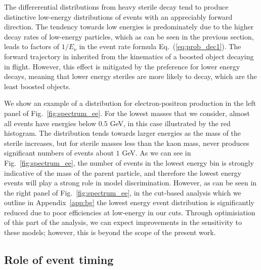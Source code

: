 \documentclass[11pt, a4paper]{article}
\newcommand{\refeq}[1]{Eq.~(\ref{#1})}
\newcommand{\reffig}[1]{Fig.~\ref{#1}}
\newcommand{\refapp}[1]{Appendix~\ref{#1}}
\begin{document}
The differerential distributions from heavy sterile decay tend to produce
distinctive low-energy distributions of events with an appreciably forward
direction. 
%
The tendency towards low energies is predominately due to the higher decay
rates of low-energy particles, which as can be seen in the previous section,
leads to factors of $1/E_\nu$ in the event rate formula \refeq{eq:prob_dec1}.
%
The forward trajectory in inherited from the kinematics of a boosted object
decaying in flight. However, this effect is mitigated by the preference for
lower energy decays, meaning that lower energy steriles are more likely to
decay, which are the least boosted objects.

We show an example of a distribution for electron-positron production in the
left panel of \reffig{fig:spectrum_ee}. For the lowest masses that we consider,
almost all events have energies below $0.5$ GeV, in this case illustrated by
the red histogram. The distribution tends towards larger energies as the mass
of the sterile increases, but for sterile masses less than the kaon mass, never
produces significant numbers of events about $1$ GeV. As we can see in
\reffig{fig:spectrum_ee}, the number of events in the lowest energy bin is
strongly indicative of the mass of the parent particle, and therefore the
lowest energy events will play a strong role in model discrimination. However,
as can be seen in the right panel of \reffig{fig:spectrum_ee}, in the cut-based
analysis which we outline in \refapp{app:bg} the lowest energy event
distribution is significantly reduced due to poor efficiencies at low-energy in
our cuts. Through optimisiation of this part of the analysis, we can expect
improvements in the sensitivity to these models; however, this is beyond the
scope of the present work. 



%
%
%

\subsection{\label{sec:timing}Role of event timing}
\end{document}
